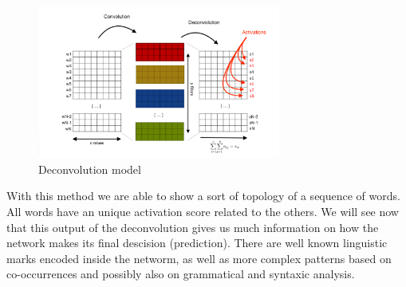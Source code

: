 \begin{figure}[h]
\begin{center}
\includegraphics[width=8cm]{img/model_deconv.png}
\caption{Deconvolution model}
\label{cnn}
\end{center}
\end{figure}

With this method we are able to show a sort of topology of a sequence of words. All words have an unique activation score related to the others. We will see now that this output of the deconvolution gives us much information on how the network makes its final descision (prediction). There are well known linguistic marks encoded inside the networm, as well as more complex patterns based on co-occurrences and possibly also on grammatical and syntaxic analysis.
